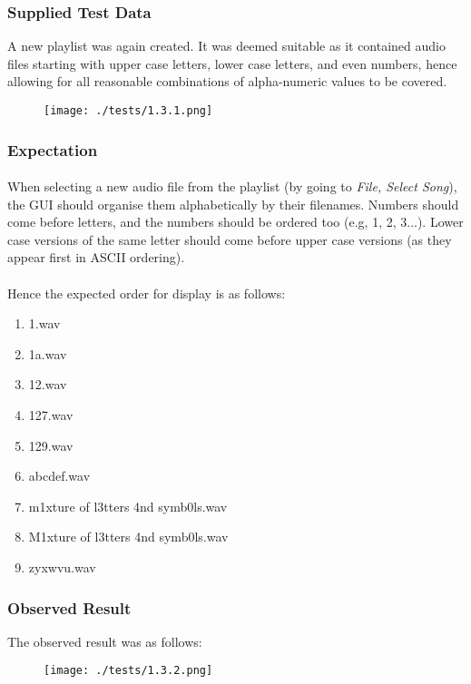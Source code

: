 \subsubsection{Supplied Test Data}
A new playlist was again created. It was deemed suitable as it contained audio files starting with upper case letters, lower case letters, and even numbers, hence allowing for all reasonable combinations of alpha-numeric values to be covered.
\begin{figure}[H]
	\texttt{[image: ./tests/1.3.1.png]}
\end{figure}

\subsubsection{Expectation}
\paragraph{}
When selecting a new audio file from the playlist (by going to \textit{File, Select Song}), the GUI should organise them alphabetically by their filenames. Numbers should come before letters, and the numbers should be ordered too (e.g, 1, 2, 3...). Lower case versions of the same letter should come before upper case versions (as they appear first in ASCII ordering).
\paragraph{}
Hence the expected order for display is as follows:
\begin{enumerate}
	\item 1.wav
	\item 1a.wav
	\item 12.wav
	\item 127.wav
	\item 129.wav
	\item abcdef.wav
	\item m1xture of l3tters 4nd symb0ls.wav
	\item M1xture of l3tters 4nd symb0ls.wav
	\item zyxwvu.wav
\end{enumerate}

\subsubsection{Observed Result}
\label{sec:evidence1.3}
The observed result was as follows:
\begin{figure}[H]
	\texttt{[image: ./tests/1.3.2.png]}
\end{figure}

